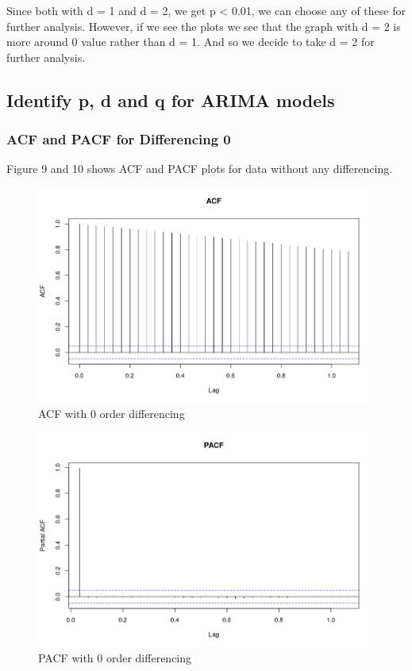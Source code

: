 \documentclass{article}
\begin{document}
Since both with d = 1 and d = 2, we get p < 0.01, we can choose any of these for further analysis. However, if we see the plots we see that the graph with d = 2 is more around 0 value rather than d = 1. And so we 
decide to take d = 2 for further analysis.

\subsection{Identify p, d and q for ARIMA models}

\subsubsection{ACF and PACF for Differencing 0}

Figure 9 and 10 shows ACF and PACF plots for data without any differencing.

\begin{figure}[ht]
	\centering
	\includegraphics[scale=0.25]{images/ts_images/ACFWith0Differencing.png}
	\caption{ACF with 0 order differencing}
	\label{fig: ACF with 0 order differencing}
\end{figure}

\begin{figure}[ht]
	\centering
	\includegraphics[scale=0.25]{images/ts_images/PACFWith0Differencing.png}
	\caption{PACF with 0 order differencing}
	\label{fig: PACF with 0 order differencing}
\end{figure}
\end{document}
